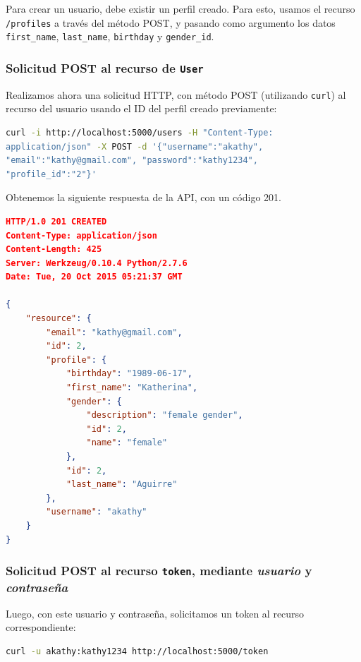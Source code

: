	Para crear un usuario, debe existir un perfil creado.
	Para esto, usamos el recurso \texttt{/profiles} a través del método POST, y pasando como argumento los datos \texttt{first\_name}, \texttt{last\_name}, \texttt{birthday} y \texttt{gender\_id}.
	
\subsubsection{Solicitud POST al recurso de \texttt{User}}
    
    Realizamos ahora una solicitud HTTP, con método POST (utilizando \texttt{curl}) al recurso del usuario usando el ID del perfil creado previamente:

\begin{lstlisting}[language=bash]
curl -i http://localhost:5000/users -H "Content-Type: 
application/json" -X POST -d '{"username":"akathy", 
"email":"kathy@gmail.com", "password":"kathy1234", 
"profile_id":"2"}'
\end{lstlisting}
    
    Obtenemos la siguiente respuesta de la API, con un código 201.
    
\begin{lstlisting}[language=json]
HTTP/1.0 201 CREATED
Content-Type: application/json
Content-Length: 425
Server: Werkzeug/0.10.4 Python/2.7.6
Date: Tue, 20 Oct 2015 05:21:37 GMT

{
    "resource": {
        "email": "kathy@gmail.com", 
        "id": 2, 
        "profile": {
            "birthday": "1989-06-17", 
            "first_name": "Katherina", 
            "gender": {
                "description": "female gender", 
                "id": 2, 
                "name": "female"
            }, 
            "id": 2, 
            "last_name": "Aguirre"
        }, 
        "username": "akathy"
    }
}
\end{lstlisting}

\subsubsection{Solicitud POST al recurso \texttt{token}, mediante \textit{usuario} y \textit{contraseña}}
    
    Luego, con este usuario y contraseña, solicitamos un token al recurso correspondiente:

\begin{lstlisting}[language=bash]
curl -u akathy:kathy1234 http://localhost:5000/token
\end{lstlisting}
   
